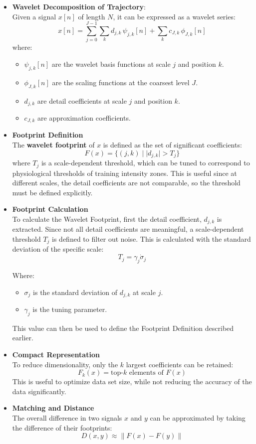 \documentclass[12pt,a4paper]{report}
\begin{document}
\begin{itemize}
	\item \textbf{Wavelet Decomposition of Trajectory}: \\ Given a signal $x[n]$ of length $N$, it can be expressed as a wavelet series:
	      \[
		      x[n] =
		      \sum_{j=0}^{J-1} \sum_{k} d_{j,k} \, \psi_{j,k}[n]
		      + \sum_{k} c_{J,k} \, \phi_{J,k}[n]
	      \]
	      where:
	      \begin{itemize}
		      \item $\psi_{j,k}[n]$ are the wavelet basis functions at scale $j$ and position $k$.
		      \item $\phi_{J,k}[n]$ are the scaling functions at the coarsest level $J$.
		      \item $d_{j,k}$ are detail coefficients at scale $j$ and position $k$.
		      \item $c_{J,k}$ are approximation coefficients.
	      \end{itemize}
	\item \textbf{Footprint Definition}\\
	      The \textbf{wavelet footprint} of $x$ is defined as the set of significant coefficients:
	      \[
		      F(x) = \{ (j,k) \;|\; |d_{j,k}| > T_j \}
	      \]
	      where $T_j$ is a scale-dependent threshold, which can be tuned to correspond to physiological thresholds of training intensity zones. This is useful since
	      at different scales, the detail coefficients are not comparable, so the threshold must be defined explicitly.

	\item \textbf{Footprint Calculation}\\
	      To calculate the Wavelet Footprint, first the detail coefficient, $d_{j,k}$ is extracted. Since not all detail coefficients are meaningful, a scale-dependent threshold $T_j$
	      is defined to filter out noise. This is calculated with the standard deviation of the specific scale:
	      \[
		      T_j = \gamma_j \dot \sigma_j
	      \]

	      Where:
	      \begin{itemize}
		      \item $\sigma_j$ is the standard deviation of $d_{j,k}$ at scale $j$.
		      \item $\gamma_j$ is the tuning parameter.
	      \end{itemize}
	      This value can then be used to define the Footprint Definition described earlier.

	\item \textbf{Compact Representation}\\
	      To reduce dimensionality, only the $k$ largest coefficients can be retained:
	      \[
		      F_k(x) = \text{top-}k \text{ elements of } F(x)
	      \]
	      This is useful to optimize data set size, while not reducing the accuracy of the data significantly.
	\item \textbf{Matching and Distance}\\
	      The overall difference in two signals $x$ and $y$ can be approximated by taking the difference of their footprints:
	      \[
		      D(x,y) \approx \| F(x) - F(y) \|
	      \]

\end{itemize}
\end{document}
